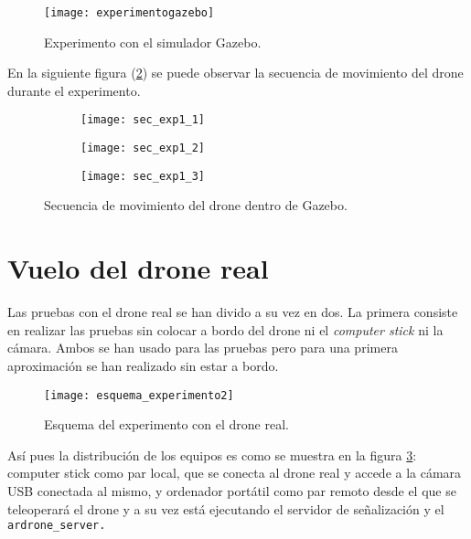 \begin{figure}[h!]
\centering
\texttt{[image: experimentogazebo]}
\caption{Experimento con el simulador Gazebo.}
\label{fig:experimentogazebo}
\end{figure}

En la siguiente figura (\ref{fig:secexp1}) se puede observar la secuencia de movimiento del drone durante el experimento.\\

\newpage
\begin{figure}[h!]
\centering
  \begin{subfigure}[]{47mm}
    \texttt{[image: sec\_exp1\_1]}
  \end{subfigure}
  \hspace{0.5pt}
  \begin{subfigure}[]{47mm}
    \texttt{[image: sec\_exp1\_2]}
  \end{subfigure}
    \hspace{0.5pt}
    \begin{subfigure}[]{47mm}
    \texttt{[image: sec\_exp1\_3]}
  \end{subfigure}
    \caption{Secuencia de movimiento del drone dentro de Gazebo.}
  \label{fig:secexp1}
\end{figure}


\section{Vuelo del drone real}

Las pruebas con el drone real se han divido a su vez en dos. La primera consiste en realizar las pruebas sin colocar a bordo del drone ni el \emph{computer stick} ni la cámara. Ambos se han usado para las pruebas pero para una primera aproximación se han realizado sin estar a bordo.\\

\begin{figure}[h!]
\centering
\texttt{[image: esquema\_experimento2]}
\caption{Esquema del experimento con el drone real.}
\label{fig:esquemaexperimento2}
\end{figure}

Así pues la distribución de los equipos es como se muestra en la figura \ref{fig:esquemaexperimento2}: computer stick como par local, que se conecta al drone real y accede a la cámara USB conectada al mismo, y ordenador portátil como par remoto desde el que se teleoperará el drone y a su vez está ejecutando el servidor de señalización y el \texttt{ardrone\_server.}\\


